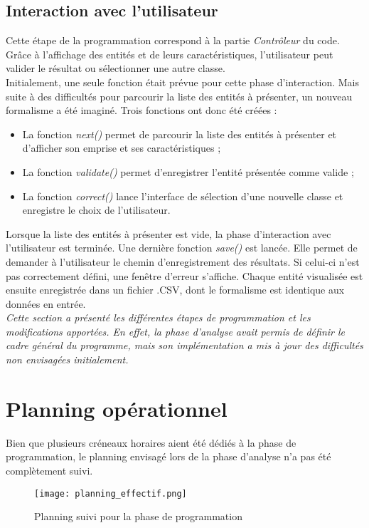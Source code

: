 \newpage
\subsection{Interaction avec l'utilisateur}

Cette étape de la programmation correspond à la partie \textit{Contrôleur} du code. Grâce à l'affichage des entités et de leurs caractéristiques, l'utilisateur peut valider le résultat ou sélectionner une autre classe. \\

Initialement, une seule fonction était prévue pour cette phase d'interaction. Mais suite à des difficultés pour parcourir la liste des entités à présenter, un nouveau formalisme a été imaginé. Trois fonctions ont donc été créées :
\begin{itemize}[label=$\rightarrow$]
	\item La fonction \textit{next()} permet de parcourir la liste des entités à présenter et d'afficher son emprise et ses caractéristiques ;
	\item La fonction \textit{validate()} permet d'enregistrer l'entité présentée comme valide ;
	\item La fonction \textit{correct()} lance l'interface de sélection d'une nouvelle classe et enregistre le choix de l'utilisateur.\\
\end{itemize}

Lorsque la liste des entités à présenter est vide, la phase d'interaction avec l'utilisateur est terminée. Une dernière fonction \textit{save()} est lancée. Elle permet de demander à l'utilisateur le chemin d'enregistrement des résultats. Si celui-ci n'est pas correctement défini, une fenêtre d'erreur s'affiche. Chaque entité visualisée est ensuite enregistrée dans un fichier .CSV, dont le formalisme est identique aux données en entrée. \\

\textit{Cette section a présenté les différentes étapes de programmation et les modifications apportées. En effet, la phase d'analyse avait permis de définir le cadre général du programme, mais son implémentation a mis à jour des difficultés non envisagées initialement.}\\

\section{Planning opérationnel}

Bien que plusieurs créneaux horaires aient été dédiés à la phase de programmation, le planning envisagé lors de la phase d'analyse n'a pas été complètement suivi. 

\begin{figure}[!h]
	\centering
	\texttt{[image: planning\_effectif.png]}  \\
	\caption[Planning suivi pour la phase de programmation]{Planning suivi pour la phase de programmation}
	\label{fig:planning}
\end{figure}


